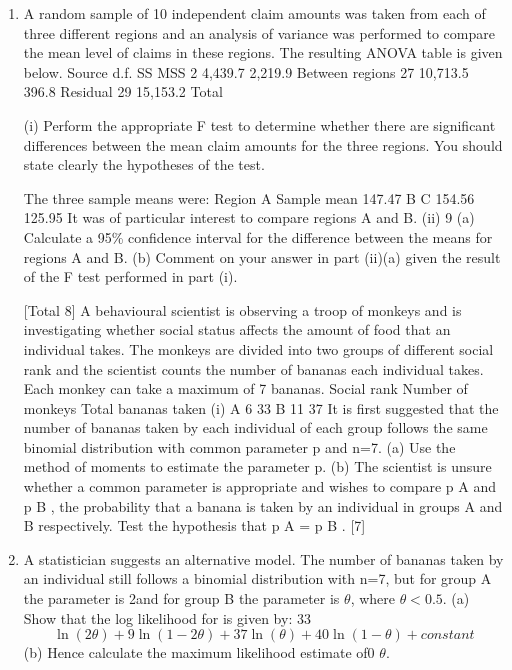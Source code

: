 \documentclass[a4paper,12pt]{article}
\begin{document}
\begin{enumerate}

\item A random sample of 10 independent claim amounts was taken from each of three
different regions and an analysis of variance was performed to compare the mean
level of claims in these regions. The resulting ANOVA table is given below.
Source
d.f.
SS
MSS
2
4,439.7
2,219.9
Between regions
27 10,713.5 396.8
Residual
29 15,153.2
Total

(i)
Perform the appropriate F test to determine whether there are significant
differences between the mean claim amounts for the three regions. You
should state clearly the hypotheses of the test.

The three sample means were:
Region
A
Sample mean 147.47
B
C
154.56 125.95
It was of particular interest to compare regions A and B.
(ii)
9
(a) Calculate a 95\% confidence interval for the difference between the
means for regions A and B.
(b) Comment on your answer in part (ii)(a) given the result of the F test
performed in part (i).

[Total 8]
A behavioural scientist is observing a troop of monkeys and is investigating whether
social status affects the amount of food that an individual takes. The monkeys are
divided into two groups of different social rank and the scientist counts the number of
bananas each individual takes. Each monkey can take a maximum of 7 bananas.
Social rank
Number of monkeys
Total bananas taken
(i)
A
6
33
B
11
37
It is first suggested that the number of bananas taken by each individual of each group follows the same binomial distribution with common parameter p
and n=7.
(a) Use the method of moments to estimate the parameter p.
(b) The scientist is unsure whether a common parameter is appropriate and wishes to compare p A and p B , the probability that a banana is taken
by an individual in groups A and B respectively.
Test the hypothesis that p A = p B .
[7]
\item 
A statistician suggests an alternative model. The number of bananas taken by
an individual still follows a binomial distribution with n=7, but for group A
the parameter is 2\theta and for group B the parameter is $\theta$, where $\theta < 0.5$.
(a)
Show that the log likelihood for \theta is given by:
33
\[\ln ( 2 \theta ) + 9 \ln ( 1 − 2 \theta ) + 37 \ln ( \theta ) + 40 \ln ( 1 − \theta ) + constant\]
(b)
Hence calculate the maximum likelihood estimate of0 $\theta$.


\end{enumerate}
\end{document}

